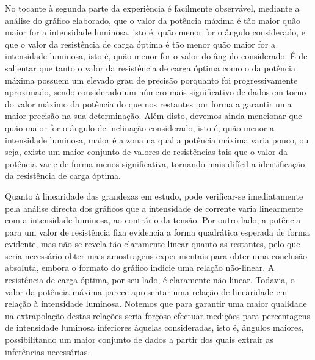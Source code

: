 \documentclass[9pt]{extarticle}
\begin{document}
\begin{multicols}{2}
\par No tocante à segunda parte da experiência é facilmente observável, mediante a análise do gráfico elaborado, que o valor da potência máxima é tão maior quão maior for a intensidade luminosa, isto é, quão menor for o ângulo considerado, e que o valor da resistência de carga óptima é tão menor quão maior for a intensidade luminosa, isto é, quão menor for o valor do ângulo considerado. É de salientar que tanto o valor da resistência de carga óptima como o da potência máxima possuem um elevado grau de precisão porquanto foi progressivamente aproximado, sendo considerado um número mais significativo de dados em torno do valor máximo da potência do que nos restantes por forma a garantir uma maior precisão na sua determinação. Além disto, devemos ainda mencionar que quão maior for o ângulo de inclinação considerado, isto é, quão menor a intensidade luminosa, maior é a zona na qual a potência máxima varia pouco, ou seja, existe um maior conjunto de valores de resistências tais que o valor da potência varie de forma menos significativa, tornando mais difícil a identificação da resistência de carga óptima.

\par Quanto à linearidade das grandezas em estudo, pode verificar-se imediatamente pela análise directa dos gráficos que a intensidade de corrente varia linearmente com a intensidade luminosa, ao contrário da tensão. Por outro lado, a potência para um valor de resistência fixa evidencia a forma quadrática esperada de forma evidente, mas não se revela tão claramente linear quanto as restantes, pelo que seria necessário obter mais amostragens experimentais para obter uma conclusão absoluta, embora o formato do gráfico indicie uma relação não-linear. A resistência de carga óptima, por seu lado, é claramente não-linear. Todavia, o valor da potência máxima parece apresentar uma relação de linearidade em relação à intensidade luminosa. Notemos que para garantir uma maior qualidade na extrapolação destas relações seria forçoso efectuar medições para percentagens de intensidade luminosa inferiores àquelas consideradas, isto é, ângulos maiores, possibilitando um maior conjunto de dados a partir dos quais extrair as inferências necessárias.


\end{multicols}
\end{document}
